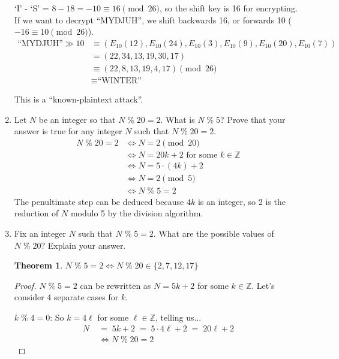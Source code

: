 \documentclass[12pt]{article}
\newcommand{\Z}{\mathbb{Z}}
\newcommand{\n}{\vspace{0.5cm}}
\newcommand{\mmod}{\;\%\;}
\newtheorem*{theorem}{Theorem}
\begin{document}
\begin{enumerate}
    `I' - `S' = \(8 - 18 = -10 \equiv 16 \pmod{26}\), so the shift key is 16 for encrypting.  If we want to decrypt ``MYDJUH'', we shift backwards 16, or forwards 10 (\(-16 \equiv 10 \pmod{26}\)).
    \begin{align*}
      \text{``MYDJUH''} \gg 10 &\equiv (E_{10}(12),E_{10}(24),E_{10}(3),E_{10}(9),E_{10}(20),E_{10}(7)) \\
                             &= (22,34,13,19,30,17) \\
                             &\equiv (22,8,13,19,4,17) \pmod{26} \\
                             &\equiv \text{``WINTER''}
    \end{align*}

    This is a ``known-plaintext attack''. \n
  
\item Let $N$ be an integer so that $N\mmod20 = 2$.  What is $N\mmod5$?  Prove that your answer is true for any integer $N$ such that $N\mmod20=2$.
  \begin{align*}
    N \mmod 20 = 2 &\iff N = 2 \pmod{20} \\
                &\iff N = 20k + 2 \text{ for some } k \in \Z \\
                &\iff N = 5 \cdot (4k) + 2 \\
                &\iff N = 2 \pmod 5 \\
                &\iff N \mmod 5 = 2
  \end{align*} 
  The penultimate step can be deduced because \(4k\) is an integer, so 2 is the reduction of \(N\) modulo 5 by the division algorithm. \n

\item Fix an integer $N$ such that $N\mmod5=2$. What are the possible values of $N\mmod20$? Explain your answer. 
  \begin{theorem}
    \(N\mmod5 = 2 \iff N\mmod20 \in \{2, 7, 12, 17\}\)
  \end{theorem}
  \begin{proof}
    \(N\mmod5 = 2\) can be rewritten as \(N = 5k + 2\) for some \(k \in \Z\).  Let's consider 4 separate cases for \(k\).

    \(k\mmod4 = 0\): So \(k = 4\ell\) for some \(\ell \in \Z\), telling us...
    \begin{align*}
      N \;&=\; 5k + 2 \;=\; 5 \cdot 4\ell + 2 \;=\; 20\ell + 2 \\
          &\iff N\mmod20 = 2
    \end{align*}


\end{proof}
\end{enumerate}
\end{document}
